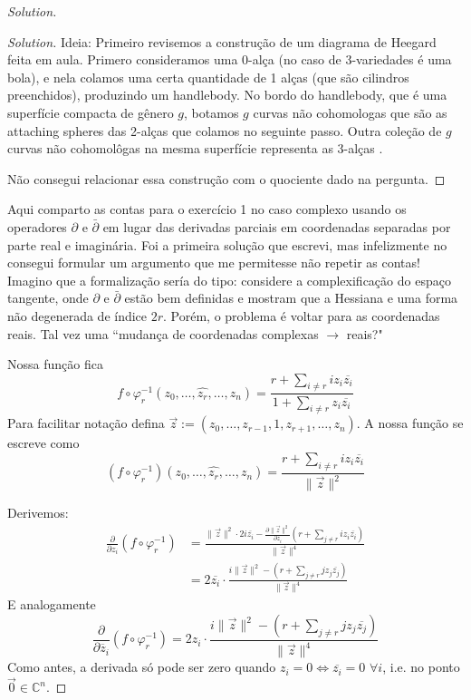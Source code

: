 \begin{proof}[Solution]
\begin{proof}[Solution]\leavevmode
	{\color{2}Ideia:} Primeiro revisemos a construção de um diagrama de Heegard feita em aula. Primero consideramos uma 0-alça (no caso de 3-variedades é uma bola), e nela colamos uma certa quantidade de 1 alças (que são cilindros preenchidos), produzindo um handlebody. No bordo do handlebody, que é uma superfície compacta de gênero \(g\), botamos \(g\) curvas não cohomologas que são as attaching spheres das 2-alças que colamos no seguinte passo. Outra coleção de \(g\) curvas não cohomolôgas na mesma superfície representa as 3-alças .

	{\color{2}Não consegui relacionar essa construção com o quociente dado na pergunta.}
\end{proof}

\clearpage

{\color{2}Aqui comparto as contas para o exercício 1 no caso complexo usando os operadores \(\partial\) e \(\bar\partial\) em lugar das derivadas parciais em coordenadas separadas por parte real e imaginária. Foi a primeira solução que escrevi, mas infelizmente no consegui formular um argumento que me permitesse não repetir as contas! Imagino que a formalização sería do tipo: considere a complexificação do espaço tangente, onde \(\partial \) e \(\bar\partial\) estão bem definidas e mostram que a Hessiana e uma forma não degenerada  de índice \(2r\). Porém, o problema é voltar para as coordenadas reais. Tal vez uma ``mudança de coordenadas complexas \(\to \) reais?"}


Nossa função fica
	\[f \circ \varphi_r^{-1}(z_0,\ldots,\widehat{z_r},\ldots,z_n)=\frac{r+\sum_{i\neq r}iz_i\overline{z_i}}{1+\sum_{i\neq r}z_i\overline{z_i}}\]
Para facilitar notação defina \(\vec{z}:=(z_0,\ldots,z_{r-1},1,z_{r+1},\ldots,z_n)\). A nossa função se escreve como
\[(f \circ \varphi_r^{-1})(z_0,\ldots,\widehat{z_r},\ldots,z_n)=\frac{r+\sum_{i\neq r}iz_i\overline{z_i}}{\|\vec{z}\|^2}\]

Derivemos:
\begin{align*}
\frac{\partial }{\partial z_i}(f \circ \varphi_r^{-1})&=\frac{\|\vec{z}\|^2\cdot 2i\overline{z_i}-\frac{\partial \|\vec{z}\|^2}{\partial z_i}\left(r+\sum_{j \neq r}iz_i\overline{z_i}\right) }{\|\vec{z}\|^4}\\
&=2\overline{z_i}\cdot  \frac{i \|\vec{z}\|^2-\left(r+\sum_{j \neq r}jz_j\overline{z_j}\right) }{\|\vec{z}\|^4}
\end{align*}
E analogamente
\[\frac{\partial }{\partial \overline{z}_i}(f \circ \varphi_r^{-1})=2z_i\cdot  \frac{i \|\vec{z}\|^2-\left(r+\sum_{j \neq r}jz_j\overline{z_j}\right) }{\|\vec{z}\|^4}
\]
Como antes, a derivada só pode ser zero quando \(z_i=0 \iff \overline{z_i}=0\) \(\forall i\), i.e. no ponto \(\vec{0}\in \mathbb{C}^n\).


\end{proof}
